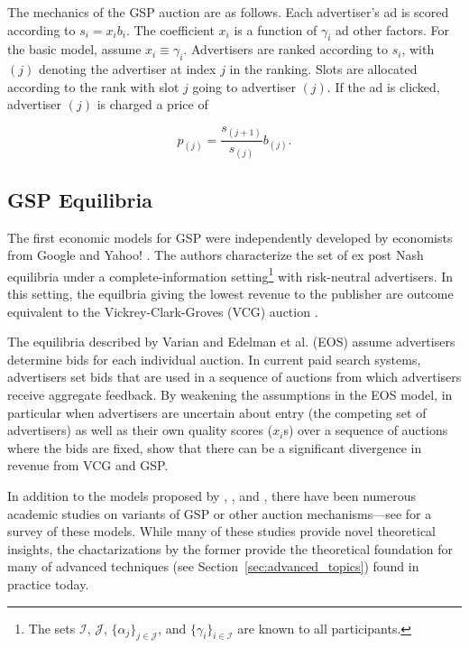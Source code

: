 \documentclass[prodmode,acmtist]{acmsmall} %
\begin{document}
The mechanics of the GSP auction are as follows.  
Each advertiser's ad is scored according to $s_i = x_i b_i$.
The coefficient $x_i$ is a function of $\gamma_i$ ad other factors.
For the basic model, assume $x_i \equiv \gamma_i$.
Advertisers are ranked according to $s_i$, with $(j)$ denoting the advertiser at index $j$ in the ranking.  
Slots are allocated according to the rank with slot $j$ going to advertiser $(j)$.  
If the ad is clicked, advertiser $(j)$ is charged a price of 

\begin{equation}
p_{(j)} = \frac{s_{(j+1)}}{s_{(j)}} b_{(j)}.	
\label{eqn:gsp-price}
\end{equation}


\subsection{GSP Equilibria} %
\label{sub:equilibrium_characterization}

The first economic models for GSP were independently developed by economists from Google \cite{Varian:2007kx}
and Yahoo! \cite{Edelman:2007vn}.
The authors characterize the set of ex post Nash equilibria under a complete-information setting\footnote{The sets $\mathcal{I}$, $\mathcal{J}$, $\{\alpha_j\}_{j\in \mathcal{J}}$, and $\{\gamma_i\}_{i \in \mathcal{I}}$ are known to all participants.} with risk-neutral advertisers.
In this setting, the equilbria giving the lowest revenue to the publisher are outcome equivalent to the Vickrey-Clark-Groves (VCG) auction \cite{Vickrey:1961ys}.

The equilibria described by Varian and Edelman et al. (EOS) assume advertisers determine bids for each individual auction. 
In current paid search systems, advertisers set bids that are used in a sequence of auctions from which advertisers receive aggregate feedback. 
By weakening the assumptions in the EOS model, in particular when advertisers are uncertain about entry (the competing set of advertisers) as well as their own quality scores ($x_i$s) over a sequence of auctions where the bids are fixed,  show that there can be a significant divergence in revenue from VCG and GSP.

In addition to the models proposed by , , and , there have been numerous academic studies on variants of GSP or other auction mechanisms---see  for a survey of these models.
While many of these studies provide novel theoretical insights, the chactarizations by the former provide the theoretical foundation for many of advanced techniques (see Section~\ref{sec:advanced_topics}) found in practice today.
\end{document}
